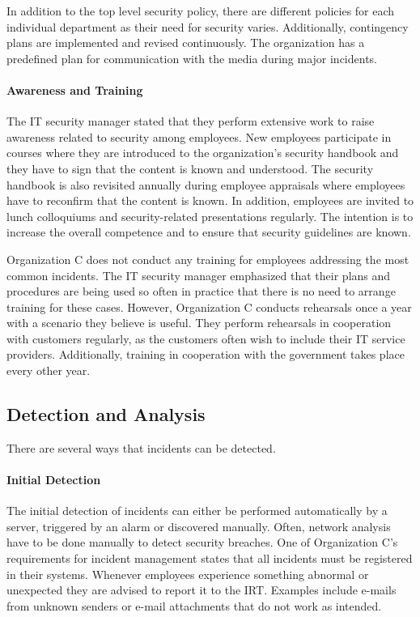 In addition to the top level security policy, there are different policies for each individual department as their need for security varies. Additionally, contingency plans are implemented and revised continuously. The organization has a predefined plan for communication with the media during major incidents. 

\paragraph{Awareness and Training}
The IT security manager stated that they perform extensive work to raise awareness related to security among employees. New employees participate in courses where they are introduced to the organization's security handbook and they have to sign that the content is known and understood. The security handbook is also revisited annually during employee appraisals where employees have to reconfirm that the content is known. In addition, employees are invited to lunch colloquiums and security-related presentations regularly. The intention is to increase the overall competence and to ensure that security guidelines are known.

Organization C does not conduct any training for employees addressing the most common incidents. The IT security manager emphasized that their plans and procedures are being used so often in practice that there is no need to arrange training for these cases. However, Organization C conducts rehearsals once a year with a scenario they believe is useful. They perform rehearsals in cooperation with customers regularly, as the customers often wish to include their IT service providers. Additionally, training in cooperation with the government takes place every other year. 

\subsection{Detection and Analysis}
There are several ways that incidents can be detected.
\paragraph{Initial Detection}
The initial detection of incidents can either be performed automatically by a server, triggered by an alarm or discovered manually. Often, network analysis have to be done manually to detect security breaches. One of Organization C's requirements for incident management states that all incidents must be registered in their systems. Whenever employees experience something abnormal or unexpected they are advised to report it to the \ac{IRT}. Examples include e-mails from unknown senders or e-mail attachments that do not work as intended.

